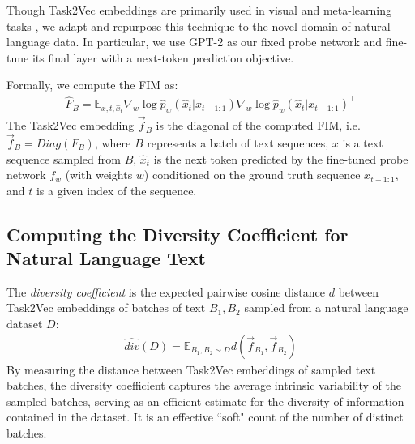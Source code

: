 \documentclass[10pt]{article} %
\begin{document}
Though Task2Vec embeddings are primarily used in visual and meta-learning tasks \citep{task2vec, curse_low_div, 9577374}, we adapt and repurpose this technique to the novel domain of natural language data. 
In particular, we use GPT-2 \citep{gpt2} as our fixed probe network and fine-tune its final layer with a next-token prediction objective. 

Formally, we compute the FIM as:
\begin{equation*}
\begin{aligned}
    \hat F_B = 
                \mathbb E_{x, t, \hat x_t}
                    \nabla_w \log \hat p_w( \hat x_t | x_{t-1:1}) \nabla_w \log \hat p_w ( \hat x_t | x_{t-1:1})^\top
\end{aligned}
\end{equation*}
The Task2Vec embedding $\vec{f}_B$ is the diagonal of the computed FIM, i.e. $\vec{f}_B = Diag(F_B)$, where $B$ represents a batch of text sequences, $x$ is a text sequence sampled from $B$, $\hat{x}_t$ is the next token predicted by the fine-tuned probe network $f_w$ (with weights $w$) conditioned on the ground truth sequence $x_{t-1:1}$, and $t$ is a given index of the sequence.

\subsection{Computing the Diversity Coefficient for Natural Language Text}
\label{body:div_coeff_natural_lang}
The \textit{diversity coefficient} is the expected pairwise cosine distance $d$ between Task2Vec embeddings of batches of text $B_1, B_2$ sampled from a natural language dataset $D$:
\begin{equation*}
\begin{aligned}
    \hat{div}(D) =
    \mathbb{E}_{B_1, B_2 \sim D} 
     d( \vec{f}_{B_1}, \vec{f}_{B_2} )
\end{aligned}
\end{equation*}
By measuring the distance between Task2Vec embeddings of sampled text batches, the diversity coefficient captures the average intrinsic variability of the sampled batches, serving as an efficient estimate for the diversity of information contained in the dataset. 
It is an effective ``soft" count of the number of distinct batches. 
\end{document}
